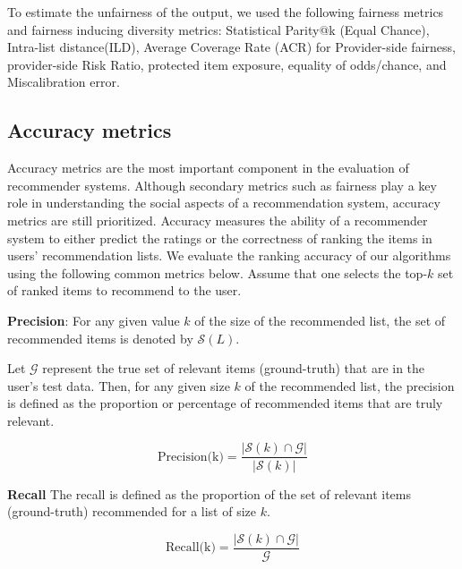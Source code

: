    To estimate the unfairness of the output, we used the following fairness metrics and fairness inducing diversity metrics: Statistical Parity@k (Equal Chance), Intra-list distance(ILD), Average Coverage Rate (ACR) for Provider-side fairness, provider-side Risk Ratio, protected item exposure, equality of odds/chance, and Miscalibration error.
    
    
    \subsection{Accuracy metrics}
    
    Accuracy metrics are the most important component in the evaluation of recommender systems. Although secondary metrics such as fairness play a key role in understanding the social aspects of a recommendation system, accuracy metrics are still prioritized. Accuracy measures the ability of a recommender system to either predict the ratings or the correctness of ranking the items in users' recommendation lists. We evaluate the ranking accuracy of our algorithms using the following common metrics below. Assume that one selects the top-$k$ set of ranked items to recommend to the user.
    
        \textbf{Precision}: For any given value $k$ of the size of the recommended list, the set of recommended items is denoted by $\mathcal{S}(L)$. 
        
        Let $\mathcal{G}$ represent the true set of relevant items (ground-truth) that are in the user's test data. Then, for any given size $k$ of the recommended list, the precision is defined as the proportion or percentage of recommended items that are truly relevant. %
        
        \begin{equation}
        \text{Precision(k)}=\frac{|\mathcal{S}(k) \displaystyle \cap \mathcal{G}|}{|\mathcal{S}(k)|}
        \label{eq:precision}
        \end{equation}
        
        
        \textbf{Recall}
        The recall is defined as the proportion of the set of relevant items (ground-truth) recommended for a list of size $k$.
        
        \begin{equation}
        \text{Recall(k)}=\frac{|\mathcal{S}(k) \displaystyle \cap \mathcal{G}|}{\mathcal{G}}
        \label{eq:recall}
        \end{equation}
        
